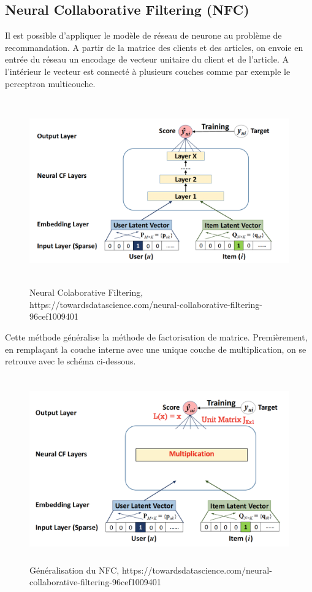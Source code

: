 \subsection{Neural Collaborative Filtering (NFC)}
Il est possible d’appliquer le modèle de réseau de neurone au problème de recommandation. A partir de la matrice des clients et des articles, on envoie en entrée du réseau un encodage de vecteur unitaire du client et de l’article. A l'intérieur le vecteur est connecté à plusieurs couches comme par exemple le perceptron multicouche. 
\newpage
\begin{figure}[h]
\begin{center}
\includegraphics[width=15cm,height=8cm]{images/neural_cf.png}
\caption[Neural Colaborative Filtering, https://towardsdatascience.com/neural-collaborative-filtering-96cef1009401]{Neural Colaborative Filtering, https://towardsdatascience.com/neural-collaborative-filtering-96cef1009401}
\label{monlabel}
\end{center}
\end{figure}
Cette méthode généralise la méthode de factorisation de matrice.
Premièrement, en remplaçant la couche interne avec une unique couche de multiplication, on se retrouve avec le schéma ci-dessous.
\begin{figure}[h]
\begin{center}
\includegraphics[width=15cm,height=8cm]{images/nfc_multiplication.png}
\caption[Généralisation du NFC, https://towardsdatascience.com/neural-collaborative-filtering-96cef1009401]{Généralisation du NFC, https://towardsdatascience.com/neural-collaborative-filtering-96cef1009401}
\label{monlabel}
\end{center}
\end{figure}

